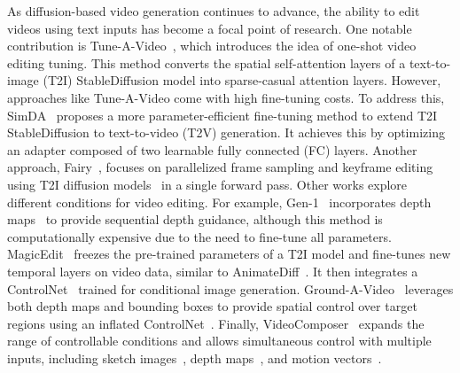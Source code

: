 As diffusion-based video generation continues to advance, the ability to edit videos using text inputs has become a focal point of research. One notable contribution is Tune-A-Video~\cite{wgw+23}, which introduces the idea of one-shot video editing tuning. This method converts the spatial self-attention layers of a text-to-image (T2I) StableDiffusion model into sparse-casual attention layers. However, approaches like Tune-A-Video come with high fine-tuning costs.
To address this, SimDA~\cite{zqh+23} proposes a more parameter-efficient fine-tuning method to extend T2I StableDiffusion to text-to-video (T2V) generation. It achieves this by optimizing an adapter composed of two learnable fully connected (FC) layers. Another approach, Fairy~\cite{bcx+23}, focuses on parallelized frame sampling and keyframe editing using T2I diffusion models~\cite{bhe23} in a single forward pass.
Other works explore different conditions for video editing. For example, Gen-1~\cite{pjp+23} incorporates depth maps~\cite{RanftlLHSK22} to provide sequential depth guidance, although this method is computationally expensive due to the need to fine-tune all parameters. MagicEdit~\cite{jhj+23} freezes the pre-trained parameters of a T2I model and fine-tunes new temporal layers on video data, similar to AnimateDiff~\cite{yca+23}. It then integrates a ControlNet~\cite{zra23} trained for conditional image generation.
Ground-A-Video~\cite{hj23} leverages both depth maps and bounding boxes to provide spatial control over target regions using an inflated ControlNet~\cite{zra23}. Finally, VideoComposer~\cite{WangYZCWZSZZ23} expands the range of controllable conditions and allows simultaneous control with multiple inputs, including sketch images~\cite{0002LYH00P021}, depth maps~\cite{RanftlLHSK22}, and motion vectors~\cite{VadakitalDLTLR22}.
\vspace{-0.2cm}

